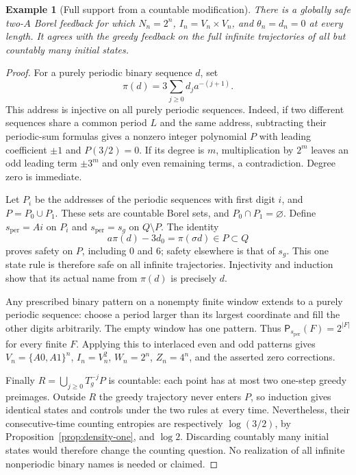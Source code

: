 \documentclass[11pt,reqno]{amsart}
\numberwithin{equation}{section}
\newtheorem{example}[theorem]{Example}
\theoremstyle{definition}
\newcommand{\Patt}{\mathsf P}
\begin{document}
\begin{example}[Full support from a countable modification]
\label{ex:periodic-support}
There is a globally safe two-$A$ Borel feedback for which
$N_n=2^n$, $I_n=V_n\times V_n$, and $\theta_n=d_n=0$ at
every length. It agrees with the greedy feedback on the full
infinite trajectories of all but countably many initial states.
\end{example}
\begin{proof}
For a purely periodic binary sequence $d$, set
\[
 \pi(d)=3\sum_{j\ge0}d_ja^{-(j+1)}.
\]
This address is injective on all purely periodic sequences.
Indeed, if two different sequences share a common period $L$
and the same address, subtracting their periodic-sum formulas
gives a nonzero integer polynomial $P$ with leading coefficient
$\pm1$ and $P(3/2)=0$. If its degree is $m$, multiplication by
$2^m$ leaves an odd leading term $\pm3^m$ and only even
remaining terms, a contradiction. Degree zero is immediate.

Let $P_i$ be the addresses of the periodic sequences with first
digit $i$, and $P=P_0\cup P_1$. These sets are countable Borel
sets, and $P_0\cap P_1=\varnothing$. Define $s_{\mathrm{per}}=Ai$
on $P_i$ and $s_{\mathrm{per}}=s_g$ on $Q\setminus P$. The identity
\[
 a\pi(d)-3d_0=\pi(\sigma d)\in P\subset Q
\]
proves safety on $P$, including $0$ and $6$; safety elsewhere
is that of $s_g$. This one state rule is therefore safe on all
infinite trajectories. Injectivity and induction show that its
actual name from $\pi(d)$ is precisely $d$.

Any prescribed binary pattern on a nonempty finite window extends to a
purely periodic sequence: choose a period larger than its largest
coordinate and fill the other digits arbitrarily. The empty window has
one pattern. Thus
$\Patt_{s_{\mathrm{per}}}(F)=2^{|F|}$ for every finite $F$.
Applying this to interlaced even and odd patterns gives
$V_n=\{A0,A1\}^n$, $I_n=V_n^2$, $W_n=2^n$, $Z_n=4^n$,
and the asserted zero corrections.

Finally $R=\bigcup_{j\ge0}T_g^{-j}P$ is countable: each point
has at most two one-step greedy preimages. Outside $R$ the
greedy trajectory never enters $P$, so induction gives identical
states and controls under the two rules at every time. Nevertheless,
their consecutive-time counting entropies are respectively
$\log(3/2)$, by Proposition~\ref{prop:density-one}, and $\log2$.
Discarding countably many initial states would therefore change
the counting question. No realization of all infinite nonperiodic
binary names is needed or claimed.
\end{proof}
\end{document}
